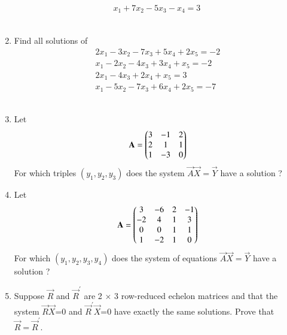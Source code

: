 \begin{enumerate}[label=\thesubsection.\arabic*.,ref=\thesubsection.\theenumi]
\begin{align}
 x_1+7x_2-5x_3-x_4=3\nonumber\
 \end{align}
%
\\
\solution

%
\item Find all solutions of
 \begin{align}
 2x_1-3x_2-7x_3+5x_4+2x_5=-2\\x_1-2x_2-4x_3+3x_4+x_5=-2\\2x_1-4x_3+2x_4+x_5=3\\x_1-5x_2-7x_3+6x_4+2x_5=-7
 \end{align}
%
\\
\solution

\item Let
\begin{align}
    \mathbf{A}=\begin{pmatrix}3 & -1 & 2\\2 & 1 & 1\\1 & -3 & 0\end{pmatrix} 
\end{align}
For which triples $(y_1,y_2,y_3)$ does the system $\vec{A}\vec{X}=\vec{Y}$ have a solution ? 
\\
\solution

\item Let
\begin{align}
    \mathbf{A}=\begin{pmatrix}3 & -6 & 2 & -1\\-2 & 4 & 1 & 3\\0 & 0 & 1& 1\\1 & -2 & 1 & 0\end{pmatrix} 
\end{align}
For which $(y_1,y_2,y_3,y_4)$ does the system of equations $\vec{A}\vec{X}=\vec{Y}$ have a solution ? 
%
\solution

%
%
\item Suppose $\vec{R}$ and $\vec{R}^{'}$ are 2 $\times$ 3 row-reduced echelon matrices and that the system $\vec{R}$$\vec{X}$=0 and $\vec{R}^{'}\vec{X}$=0 have exactly the same solutions. Prove 
that $\vec{R}=\vec{R}^{'}$.

\solution

\end{enumerate}


